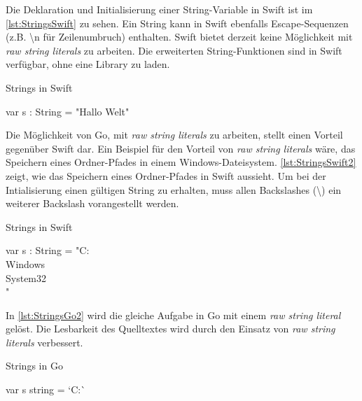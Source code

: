 Die Deklaration und Initialisierung einer String-Variable in Swift ist im \autoref{lst:StringsSwift} zu sehen.
Ein String kann in Swift ebenfalls Escape-Sequenzen (z.B. {\textbackslash}n für Zeilenumbruch) enthalten.
Swift bietet derzeit keine Möglichkeit mit \emph{raw string literals} zu arbeiten. 
Die erweiterten String-Funktionen sind in Swift verfügbar, ohne eine Library zu laden.

\begin{listing}
\caption{Strings in Swift}
\label{lst:StringsSwift}
\begin{SwiftCode}
var s : String = "Hallo Welt"
\end{SwiftCode}
\end{listing}

Die Möglichkeit von Go, mit \emph{raw string literals} zu arbeiten, stellt einen Vorteil gegenüber Swift dar. 
Ein Beispiel für den Vorteil von \emph{raw string literals} wäre, das Speichern eines Ordner-Pfades in einem Windows-Dateisystem.
\autoref{lst:StringsSwift2} zeigt, wie das Speichern eines Ordner-Pfades in Swift aussieht.
Um bei der Intialisierung einen gültigen String zu erhalten, muss allen Backslashes (\textbackslash) ein weiterer Backslash vorangestellt werden. 

\begin{listing}
\caption{Strings in Swift}
\label{lst:StringsSwift2}
\begin{SwiftCode}
var s : String = "C:\\Windows\\System32\\"
\end{SwiftCode}
\end{listing}

In \autoref{lst:StringsGo2} wird die gleiche Aufgabe in Go mit einem \emph{raw string literal} gelöst. 
Die Lesbarkeit des Quelltextes wird durch den Einsatz von \emph{raw string literals} verbessert.

\begin{listing}
\caption{Strings in Go}
\label{lst:StringsGo2}
\begin{GoCode}
var s string = `C:\Windows{}\`
\end{GoCode}
\end{listing}



